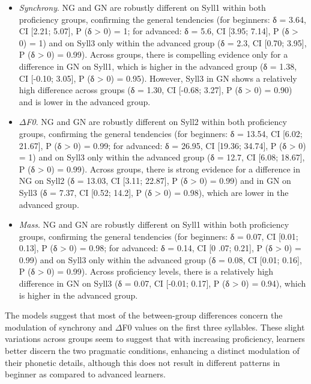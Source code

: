 \begin{itemize}
\item \textit{Synchrony}. NG and GN are robustly different on Syll1 within both proficiency groups, confirming the general tendencies (for beginners: δ = 3.64, CI [2.21; 5.07], P (δ > 0) = 1; for advanced: δ = 5.6, CI [3.95; 7.14], P (δ > 0) = 1) and on Syll3 only within the advanced group (δ = 2.3, CI [0.70; 3.95], P (δ > 0) = 0.99). Across groups, there is compelling evidence only for a difference in GN on Syll1, which is higher in the advanced group (δ = 1.38, CI [-0.10; 3.05], P (δ > 0) = 0.95). However, Syll3 in GN shows a relatively high difference across groups (δ = 1.30, CI [-0.68; 3.27], P (δ > 0) = 0.90) and is lower in the advanced group.
\item \textit{${\Delta}$F0}. NG and GN are robustly different on Syll2 within both proficiency groups, confirming the general tendencies (for beginners: δ = 13.54, CI [6.02; 21.67], P (δ > 0) = 0.99; for advanced: δ = 26.95, CI [19.36; 34.74], P (δ > 0) = 1) and on Syll3 only within the advanced group (δ = 12.7, CI [6.08; 18.67], P (δ > 0) = 0.99). Across groups, there is strong evidence for a difference in NG on Syll2 (δ = 13.03, CI [3.11; 22.87], P (δ > 0) = 0.99) and in GN on Syll3 (δ = 7.37, CI [0.52; 14.2], P (δ > 0) = 0.98), which are lower in the advanced group.
\item \textit{Mass}. NG and GN are robustly different on Syll1 within both proficiency groups, confirming the general tendencies (for beginners: δ = 0.07, CI [0.01; 0.13], P (δ > 0) = 0.98; for advanced: δ = 0.14, CI [0 .07; 0.21], P (δ > 0) = 0.99) and on Syll3 only within the advanced group (δ = 0.08, CI [0.01; 0.16], P (δ > 0) = 0.99). Across proficiency levels, there is a relatively high difference in GN on Syll3 (δ = 0.07, CI [-0.01; 0.17], P (δ > 0) = 0.94), which is higher in the advanced group.
\end{itemize}

The models suggest that most of the between-group differences concern the modulation of synchrony and ${\Delta}$F0 values on the first three syllables. These slight variations across groups seem to suggest that with increasing proficiency, learners better discern the two pragmatic conditions, enhancing a distinct modulation of their phonetic details, although this does not result in different patterns in beginner as compared to advanced learners. 

